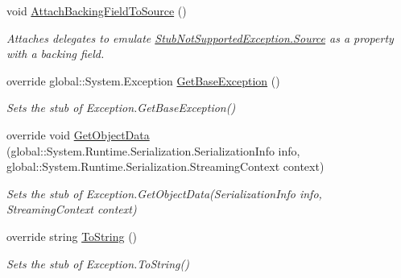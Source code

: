 \begin{DoxyCompactItemize}
void \hyperlink{class_system_1_1_fakes_1_1_stub_not_supported_exception_aef5d30902f546418667a36814083ed49}{Attach\-Backing\-Field\-To\-Source} ()
\begin{DoxyCompactList}\small\item\em Attaches delegates to emulate \hyperlink{class_system_1_1_fakes_1_1_stub_not_supported_exception_acc44c9e744891a4cbdc430c839f58744}{Stub\-Not\-Supported\-Exception.\-Source} as a property with a backing field.\end{DoxyCompactList}\item 
override global\-::\-System.\-Exception \hyperlink{class_system_1_1_fakes_1_1_stub_not_supported_exception_a260b999038b78e8e91127818f5a2780a}{Get\-Base\-Exception} ()
\begin{DoxyCompactList}\small\item\em Sets the stub of Exception.\-Get\-Base\-Exception()\end{DoxyCompactList}\item 
override void \hyperlink{class_system_1_1_fakes_1_1_stub_not_supported_exception_a277b4a7c15abff6607e23dd1e97383c6}{Get\-Object\-Data} (global\-::\-System.\-Runtime.\-Serialization.\-Serialization\-Info info, global\-::\-System.\-Runtime.\-Serialization.\-Streaming\-Context context)
\begin{DoxyCompactList}\small\item\em Sets the stub of Exception.\-Get\-Object\-Data(\-Serialization\-Info info, Streaming\-Context context)\end{DoxyCompactList}\item 
override string \hyperlink{class_system_1_1_fakes_1_1_stub_not_supported_exception_a3aff10ebf9def91c6ce28a857bf23095}{To\-String} ()
\begin{DoxyCompactList}\small\item\em Sets the stub of Exception.\-To\-String()\end{DoxyCompactList}\end{DoxyCompactItemize}
